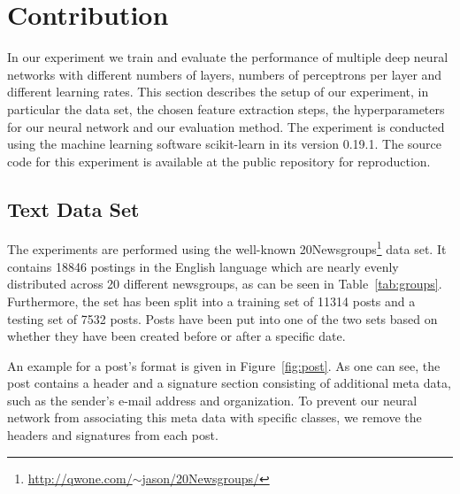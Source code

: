 \documentclass[sigconf]{acmart}
\begin{document}
\section{Contribution}

In our experiment we train and evaluate the performance of multiple deep neural networks with different numbers of layers, numbers of perceptrons per layer and different learning rates.
This section describes the setup of our experiment, in particular the data set, the chosen feature extraction steps, the hyperparameters for our neural network and our evaluation method. The experiment is conducted using the machine learning software scikit-learn\cite{scikit-learn} in its version 0.19.1.
The source code for this experiment is available at the public repository\cite{exp-code} for reproduction.

\subsection{Text Data Set}
\label{text-data-set}

The experiments are performed using the well-known 20Newsgroups\footnote{\href{http://qwone.com/~jason/20Newsgroups/}{http://qwone.com/$\sim$jason/20Newsgroups/}} data set. It contains 18846 postings in the English language which are nearly evenly distributed across 20 different newsgroups, as can be seen in Table~\ref{tab:groups}. Furthermore, the set has been split into a training set of 11314 posts and a testing set of 7532 posts. Posts have been put into one of the two sets based on whether they have been created before or after a specific date\cite{sklearn-newsgroup}.

An example for a post's format is given in Figure~\ref{fig:post}. As one can see, the post contains a header and a signature section consisting of additional meta data, such as the sender's e-mail address and organization. To prevent our neural network from associating this meta data with specific classes, we remove the headers and signatures from each post.
\end{document}
